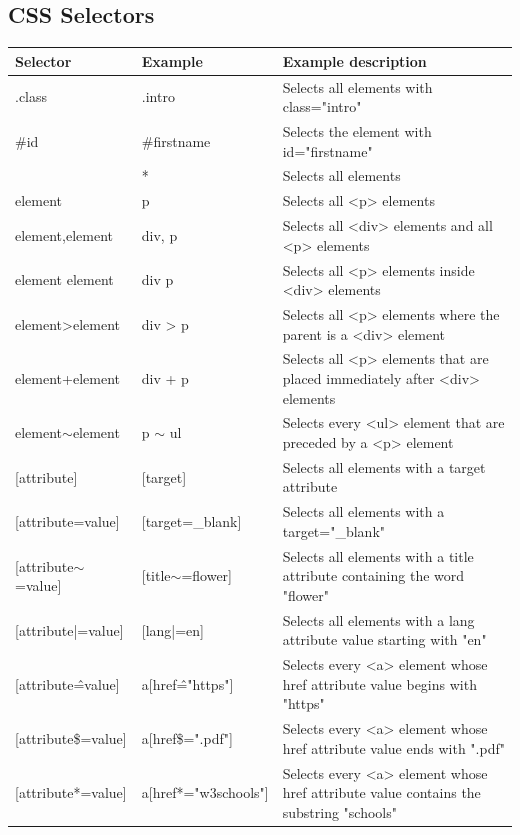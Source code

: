 \documentclass[11pt]{article}
\begin{document}
		\subsection{CSS Selectors}
			\begin{tabularx}{\textwidth}{|p{} | p{} | X|}
				\hline
				\textbf{Selector} & \textbf{Example} & \textbf{Example description} \\
				\hline
				\hline
				.class 	& .intro 			& Selects all elements with class="intro" \\
				\hline
				\#id 	& \#firstname 		& Selects the element with id="firstname" \\
				\hline
				\* 		& * 				& Selects all elements \\
				\hline
				element & p 				& Selects all <p> elements \\
				\hline
				element,element & div, p 	& Selects all <div> elements and all <p> elements \\
				\hline
				element element & div p 	& Selects all <p> elements inside <div> elements \\
				\hline
				element>element & div > p 	& Selects all <p> elements where the parent is a <div> element \\
				\hline
				element+element & div + p 	& Selects all <p> elements that are placed immediately after <div> elements \\
				\hline
				element$\sim$element & p $\sim$ ul 	& Selects every <ul> element that are preceded by a <p> element \\
				\hline
				{[attribute]} & [target] 		& Selects all elements with a target attribute \\
				\hline
				{[attribute=value]} & [target=\_blank] 		& Selects all elements with a target="\_blank" \\
				\hline
				{[attribute$\sim$=value]} & [title$\sim$=flower] & Selects all elements with a title attribute containing the word "flower" \\
				\hline
				{[attribute|=value]} & [lang|=en] & Selects all elements with a lang attribute value starting with "en" \\
				\hline
				{[attribute\^=value]} & a[href\^="https"] & Selects every <a> element whose href attribute value begins with "https" \\
				\hline
				{[attribute\$=value]} & a[href\$=".pdf"] & Selects every <a> element whose href attribute value ends with ".pdf" \\
				\hline
				{[attribute*=value]} & a[href*="w3schools"] & Selects every <a> element whose href attribute value contains the substring "schools" \\

\end{tabularx}
\end{document}
